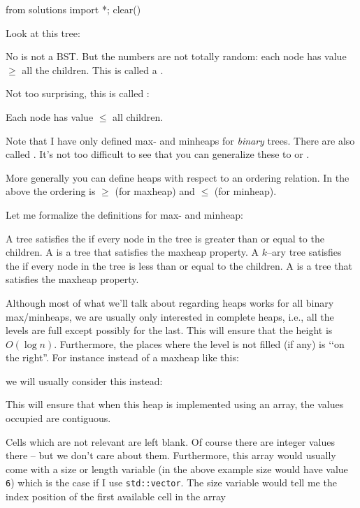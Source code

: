 \begin{python0}
from solutions import *; clear()
\end{python0}

Look at this tree:



No is not a BST.
But the numbers are not totally random:
each node has value $\geq$ all
the children.
This is called a .

Not too surprising, this is called :



Each node has value $\leq$ all children.

Note that I have only defined max- and minheaps for \textit{binary} 
trees.
There are also called .
It's not too difficult to see that you can
generalize these to
or
.

More generally you can define heaps with respect to an ordering relation.
In the above the ordering is $\geq$ (for maxheap)
and $\leq$ (for minheap).

Let me formalize the definitions for max- and minheap:

A tree satisfies the 
if every node in the tree is greater than or equal to the children.
A  is a tree that satisfies the maxheap property.
A $k$--ary tree satisfies the 
if every node in the tree is less than or equal  to the children.
A  is a tree that satisfies the maxheap property.

Although most of what we'll talk about regarding heaps works
for all binary max/minheaps, we are usually only interested in
complete heaps, i.e., all the levels are full except possibly for the last.
This will ensure that the height is $O(\log n)$.
Furthermore, the places where the level is not filled (if any)
is \lq\lq on the
right''.
For instance instead of a maxheap like this:




we will usually consider this instead:



This will ensure that when this heap is implemented
using an array, the values occupied are contiguous.



Cells which are not relevant are left blank.
Of course there are integer values there --
but we don't care about them.
Furthermore, this array would usually come with a
size or length variable (in the above example size would have value
\texttt{6}) which is the case if I use
\verb!std::vector!.
The size variable would tell me the index position of
the first available cell in the array

